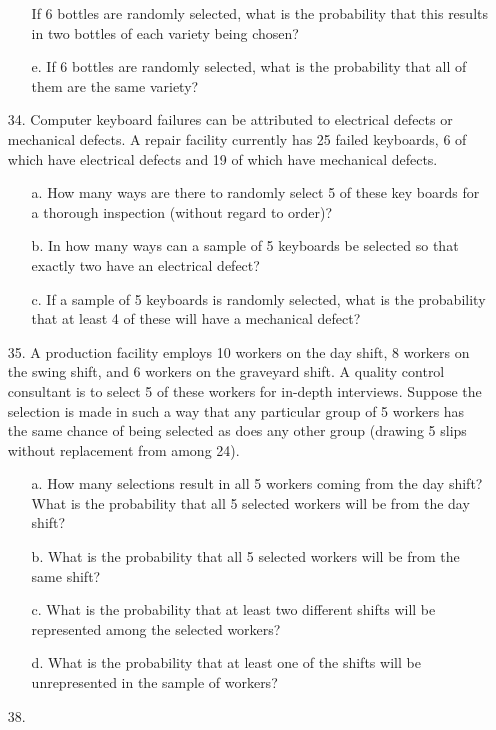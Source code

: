\documentclass[letterpaper,12pt]{article}
\begin{document}
\begin{enumerate}
\begin{enumerate}
        If 6 bottles are randomly selected, what is the probability that this results in two bottles of each variety being chosen?
      \item[e.]
        If 6 bottles are randomly selected, what is the probability that all of them are the same variety?
    \end{enumerate}
  \item[34.]
    Computer keyboard failures can be attributed to electrical defects or mechanical defects. A repair facility currently has 25 failed keyboards, 6 of which have electrical defects and 19 of which have mechanical defects.
    \begin{enumerate}
      \item[a.]
        How many ways are there to randomly select 5 of these key boards for a thorough inspection (without regard to order)?
      \item[b.]
        In how many ways can a sample of 5 keyboards be selected so that exactly two have an electrical defect?
      \item[c.]
        If a sample of 5 keyboards is randomly selected, what is the probability that at least 4 of these will have a mechanical defect?
    \end{enumerate}
  \item[35.]
    A production facility employs 10 workers on the day shift, 8 workers on the swing shift, and 6 workers on the graveyard shift. A quality control consultant is to select 5 of these workers for in-depth interviews. Suppose the selection is made in such a way that any particular group of 5 workers has the same chance of being selected as does any other group (drawing 5 slips without replacement from among 24).
    \begin{enumerate}
      \item[a.]
        How many selections result in all 5 workers coming from the day shift? What is the probability that all 5 selected workers will be from the day shift?
      \item[b.]
        What is the probability that all 5 selected workers will be from the same shift?
      \item[c.]
        What is the probability that at least two different shifts will be represented among the selected workers?
      \item[d.]
        What is the probability that at least one of the shifts will be unrepresented in the sample of workers?
    \end{enumerate}
  \item[38.]

\end{enumerate}
\end{document}

